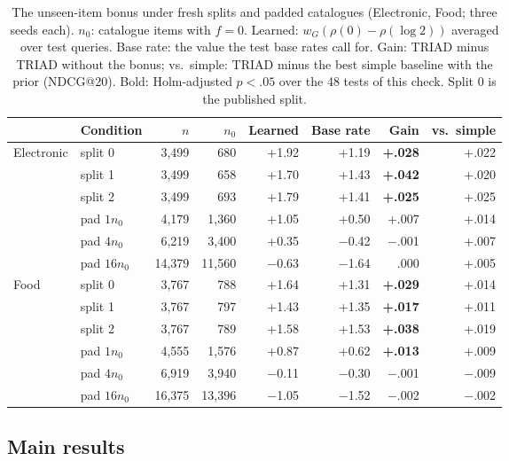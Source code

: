 \documentclass[runningheads]{llncs}
\begin{document}
\begin{table}[t]
\centering
\caption{The unseen-item bonus under fresh splits and padded catalogues (Electronic, Food; three seeds each).
$n_0$: catalogue items with $f=0$. Learned: $w_G(\rho(0)-\rho(\log 2))$ averaged over test queries. Base rate: the
value the test base rates call for. Gain: TRIAD minus TRIAD without the bonus; vs.\ simple: TRIAD minus the best simple
baseline with the prior (NDCG@20). Bold: Holm-adjusted $p<.05$ over the 48 tests of this check. Split 0 is the
published split.}
\label{tab:catalogue}
\setlength{\tabcolsep}{3.5pt}
\scriptsize
\begin{tabular}{llrrrrrr}
\toprule
 & Condition & $n$ & $n_0$ & Learned & Base rate & Gain & vs.\ simple\\
\midrule
Electronic & split 0 & 3,499 & 680 & +1.92 & +1.19 & \textbf{+.028} & +.022\\
 & split 1 & 3,499 & 658 & +1.70 & +1.43 & \textbf{+.042} & +.020\\
 & split 2 & 3,499 & 693 & +1.79 & +1.41 & \textbf{+.025} & +.025\\
 & pad $1n_0$ & 4,179 & 1,360 & +1.05 & +0.50 & +.007 & +.014\\
 & pad $4n_0$ & 6,219 & 3,400 & +0.35 & $-$0.42 & $-$.001 & +.007\\
 & pad $16n_0$ & 14,379 & 11,560 & $-$0.63 & $-$1.64 & .000 & +.005\\
\midrule
Food & split 0 & 3,767 & 788 & +1.64 & +1.31 & \textbf{+.029} & +.014\\
 & split 1 & 3,767 & 797 & +1.43 & +1.35 & \textbf{+.017} & +.011\\
 & split 2 & 3,767 & 789 & +1.58 & +1.53 & \textbf{+.038} & +.019\\
 & pad $1n_0$ & 4,555 & 1,576 & +0.87 & +0.62 & \textbf{+.013} & +.009\\
 & pad $4n_0$ & 6,919 & 3,940 & $-$0.11 & $-$0.30 & $-$.001 & $-$.009\\
 & pad $16n_0$ & 16,375 & 13,396 & $-$1.05 & $-$1.52 & $-$.002 & $-$.002\\
\bottomrule
\end{tabular}
\end{table}

\subsection{Main results}
\label{sec:main}
\end{document}
